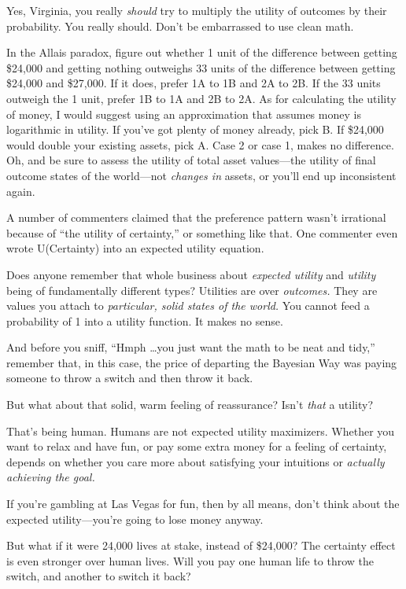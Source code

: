 {
 Yes, Virginia, you really \textit{should} try to multiply the
utility of outcomes by their probability. You really should.
Don't be embarrassed to use clean math.}

{
 In the Allais paradox, figure out whether 1 unit of the difference
between getting \$24,000 and getting nothing outweighs 33 units of the
difference between getting \$24,000 and \$27,000. If it does, prefer 1A
to 1B and 2A to 2B. If the 33 units outweigh the 1 unit, prefer 1B to
1A and 2B to 2A. As for calculating the utility of money, I would
suggest using an approximation that assumes money is logarithmic in
utility. If you've got plenty of money already, pick B.
If \$24,000 would double your existing assets, pick A. Case 2 or case
1, makes no difference. Oh, and be sure to assess the utility of total
asset values---the utility of final outcome states of the world---not
\textit{changes in} assets, or you'll end up
inconsistent again.}

{
 A number of commenters claimed that the preference pattern
wasn't irrational because of ``the
utility of certainty,'' or something like that. One
commenter even wrote U(Certainty) into an expected utility equation.}

{
 Does anyone remember that whole business about \textit{expected
utility} and \textit{utility} being of fundamentally different types?
Utilities are over \textit{outcomes.} They are values you attach to
\textit{particular, solid states of the world.} You cannot feed a
probability of 1 into a utility function. It makes no sense.}

{
 And before you sniff, ``Hmph \ldots you just want
the math to be neat and tidy,'' remember that, in
this case, the price of departing the Bayesian Way was paying someone
to throw a switch and then throw it back.}

{
 But what about that solid, warm feeling of reassurance?
Isn't \textit{that} a utility?}

{
 That's being human. Humans are not expected
utility maximizers. Whether you want to relax and have fun, or pay some
extra money for a feeling of certainty, depends on whether you care
more about satisfying your intuitions or \textit{actually achieving the
goal.}}

{
 If you're gambling at Las Vegas for fun, then by
all means, don't think about the expected
utility---you're going to lose money anyway.}

{
 But what if it were 24,000 lives at stake, instead of \$24,000?
The certainty effect is even stronger over human lives. Will you pay
one human life to throw the switch, and another to switch it back?}

